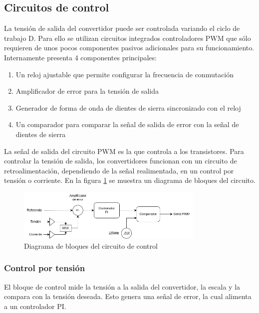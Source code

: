 \subsection{Circuitos de control}

La tensión de salida del convertidor puede ser controlada variando el ciclo de trabajo D. 
Para ello se utilizan circuitos integrados controladores PWM que sólo requieren de unos pocos componentes pasivos adicionales para su funcionamiento. 
Internamente presenta 4 componentes principales:
\begin{enumerate}
    \item Un reloj ajustable que permite configurar la frecuencia de conmutación
    \item Amplificador de error para la tensión de salida
    \item Generador de forma de onda de dientes de sierra sincronizado con el reloj
    \item Un comparador para comparar la señal de salida de error con la señal de dientes de sierra
\end{enumerate}

La señal de salida del circuito PWM es la que controla a los transistores. 
Para controlar la tensión de salida, los convertidores funcionan con un circuito de retroalimentación,
dependiendo de la señal realimentada, en un control por tensión o corriente. En la figura \ref{fig:marco_teorico:control} se muestra un diagrama de bloques del circuito.

\begin{figure}[ht]
    \centering
    \includegraphics[width=0.8\textwidth]{images/compensador.png}
    \caption{Diagrama de bloques del circuito de control}
    \label{fig:marco_teorico:control}
\end{figure}

\subsubsection{Control por tensión}

El bloque de control mide la tensión a la salida del convertidor, la escala y la compara con la tensión deseada.
Esto genera una señal de error, la cual alimenta a un controlador PI.

